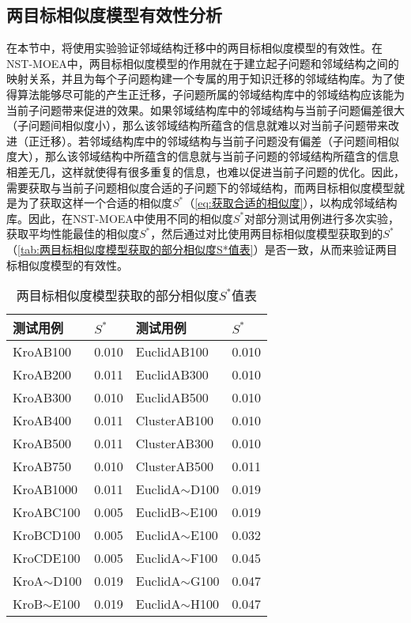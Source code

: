 \subsection{两目标相似度模型有效性分析}
\label{subsec:NST:实验与讨论:两目标相似度模型有效性分析}
在本节中，将使用实验验证邻域结构迁移中的两目标相似度模型的有效性。在NST-MOEA中，两目标相似度模型的作用就在于建立起子问题和邻域结构之间的映射关系，并且为每个子问题构建一个专属的用于知识迁移的邻域结构库。为了使得算法能够尽可能的产生正迁移，子问题所属的邻域结构库中的邻域结构应该能为当前子问题带来促进的效果。如果邻域结构库中的邻域结构与当前子问题偏差很大（子问题间相似度小），那么该邻域结构所蕴含的信息就难以对当前子问题带来改进（正迁移）。若邻域结构库中的邻域结构与当前子问题没有偏差（子问题间相似度大），那么该邻域结构中所蕴含的信息就与当前子问题的邻域结构所蕴含的信息相差无几，这样就使得有很多重复的信息，也难以促进当前子问题的优化。因此，需要获取与当前子问题相似度合适的子问题下的邻域结构，而两目标相似度模型就是为了获取这样一个合适的相似度$S^*$（\autoref{eq:获取合适的相似度}），以构成邻域结构库。因此，在NST-MOEA中使用不同的相似度$S^*$对部分测试用例进行多次实验，获取平均性能最佳的相似度$S^*$，然后通过对比使用两目标相似度模型获取到的$S^*$（\autoref{tab:两目标相似度模型获取的部分相似度S*值表}）是否一致，从而来验证两目标相似度模型的有效性。
\begin{table}[h]
    \centering
    \caption{两目标相似度模型获取的部分相似度$S^*$值表 \label{tab:两目标相似度模型获取的部分相似度S*值表}}
    \begin{tabular}{ll|ll}
        \toprule
        测试用例   & $S^*$  & 测试用例    & $S^*$ \\
        \midrule
        KroAB100          & 0.010    & EuclidAB100         & 0.010   \\
        KroAB200          & 0.011    & EuclidAB300         & 0.010   \\
        KroAB300          & 0.010    & EuclidAB500         & 0.010   \\
        KroAB400          & 0.011    & ClusterAB100        & 0.010   \\
        KroAB500          & 0.011    & ClusterAB300        & 0.010   \\
        KroAB750          & 0.010    & ClusterAB500        & 0.011   \\
        KroAB1000         & 0.011    & EuclidA$\sim$D100   & 0.019   \\
        KroABC100         & 0.005    & EuclidB$\sim$E100   & 0.019   \\
        KroBCD100         & 0.005    & EuclidA$\sim$E100   & 0.032   \\
        KroCDE100         & 0.005    & EuclidA$\sim$F100  & 0.045   \\
        KroA$\sim$D100    & 0.019    & EuclidA$\sim$G100   & 0.047   \\
        KroB$\sim$E100    & 0.019    & EuclidA$\sim$H100   & 0.047   \\
        \bottomrule
    \end{tabular}
\end{table}
